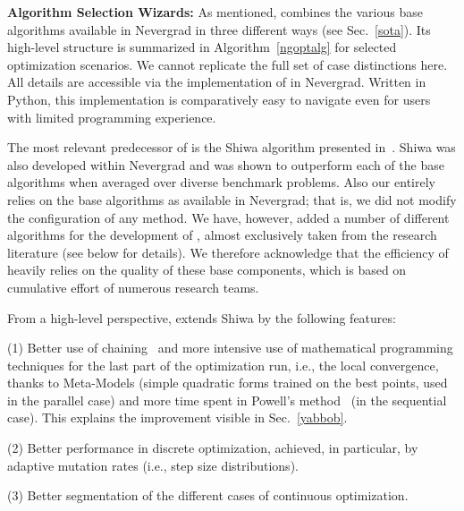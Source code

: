 {\textbf{Algorithm Selection Wizards:} 
As mentioned, \ngoptq{} combines the various base algorithms available in Nevergrad in three different ways (see Sec.~\ref{sota}). Its high-level structure is summarized in Algorithm~\ref{ngoptalg} for selected optimization scenarios. We cannot replicate the full set of case distinctions here. All details are accessible via the implementation of \ngoptq{} in Nevergrad. Written in Python, this implementation is comparatively easy to navigate even for users with limited programming experience.} 

The most relevant predecessor of \ngoptq{} is the Shiwa algorithm presented in~\cite{versatile}. Shiwa was also developed within Nevergrad and was shown to outperform each of the base algorithms when averaged over diverse benchmark problems.  {Also our \ngoptq{} entirely relies on the base algorithms as available in Nevergrad; that is, we did not modify the configuration of any method. We have, however, added a number of different algorithms for the development of \ngoptq{}, almost exclusively taken from the research literature (see below for details).} We therefore acknowledge that the efficiency of \ngoptq{} heavily relies on the quality of these base components, which is based on cumulative effort of numerous research teams.  	

From a high-level perspective, \ngoptq{} extends Shiwa by the following features:
 
(1) Better use of chaining~\cite{chaining} and more intensive use of mathematical programming techniques for the last part of the optimization run, {i.e., the local convergence, thanks to Meta-Models (simple quadratic forms trained on the best points, used in the parallel case) and more time spent in Powell's method~\cite{powell} (in the sequential case).}
  This explains the improvement visible in Sec.~\ref{yabbob}.
 
(2) Better performance in discrete optimization, achieved, in particular, by adaptive mutation rates (i.e., step size distributions). 
 	
(3) Better segmentation of the different cases of continuous optimization. 
 	
